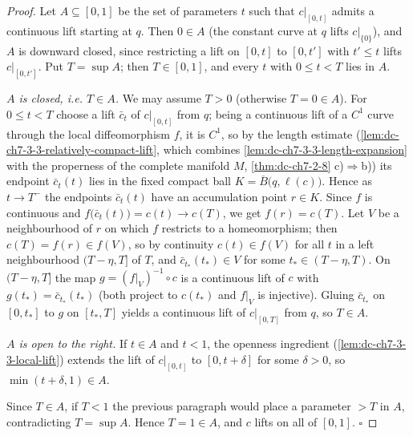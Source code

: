 \begin{proof}
  \leanok
  Let $A\subseteq[0,1]$ be the set of parameters $t$ such that $c|_{[0,t]}$ admits
  a continuous lift starting at $q$. Then $0\in A$ (the constant curve at $q$
  lifts $c|_{\{0\}}$), and $A$ is downward closed, since restricting a lift on
  $[0,t]$ to $[0,t']$ with $t'\le t$ lifts $c|_{[0,t']}$. Put $T=\sup A$; then
  $T\in[0,1]$, and every $t$ with $0\le t<T$ lies in $A$.

  \emph{$A$ is closed, i.e. $T\in A$.} We may assume $T>0$ (otherwise $T=0\in A$).
  For $0\le t<T$ choose a lift $\bar c_t$ of $c|_{[0,t]}$ from $q$; being a
  continuous lift of a $C^1$ curve through the local diffeomorphism $f$, it is
  $C^1$, so by the length estimate (\cref{lem:dc-ch7-3-3-relatively-compact-lift},
  which combines \cref{lem:dc-ch7-3-3-length-expansion} with the properness of the
  complete manifold $M$, \cref{thm:dc-ch7-2-8} c)$\Rightarrow$b)) its endpoint
  $\bar c_t(t)$ lies in the fixed compact ball $K=\overline B\big(q,\ell(c)\big)$.
  Hence as $t\to T^-$ the endpoints $\bar c_t(t)$ have an accumulation point
  $r\in K$. Since $f$ is continuous and $f\big(\bar c_t(t)\big)=c(t)\to c(T)$, we
  get $f(r)=c(T)$. Let $V$ be a neighbourhood of $r$ on which $f$ restricts to a
  homeomorphism; then $c(T)=f(r)\in f(V)$, so by continuity $c(t)\in f(V)$ for all
  $t$ in a left neighbourhood $(T-\eta,T]$ of $T$, and $\bar c_{t_*}(t_*)\in V$ for
  some $t_*\in(T-\eta,T)$. On $(T-\eta,T]$ the map $g=(f|_V)^{-1}\circ c$ is a
  continuous lift of $c$ with $g(t_*)=\bar c_{t_*}(t_*)$ (both project to $c(t_*)$
  and $f|_V$ is injective). Gluing $\bar c_{t_*}$ on $[0,t_*]$ to $g$ on $[t_*,T]$
  yields a continuous lift of $c|_{[0,T]}$ from $q$, so $T\in A$.

  \emph{$A$ is open to the right.} If $t\in A$ and $t<1$, the openness ingredient
  (\cref{lem:dc-ch7-3-3-local-lift}) extends the lift of $c|_{[0,t]}$ to
  $[0,t+\delta]$ for some $\delta>0$, so $\min(t+\delta,1)\in A$.

  Since $T\in A$, if $T<1$ the previous paragraph would place a parameter
  $>T$ in $A$, contradicting $T=\sup A$. Hence $T=1\in A$, and $c$ lifts on all of
  $[0,1]$. $\square$
\end{proof}


